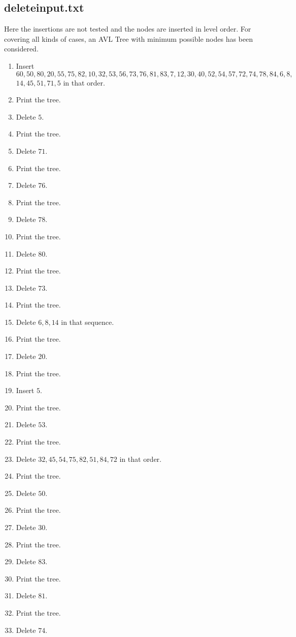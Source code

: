 \documentclass{article}
\begin{document}
\subsection{deleteinput.txt}
Here the insertions are not tested and the nodes are inserted in level order. For covering all kinds of cases, an AVL Tree with minimum possible nodes has been considered.
\begin{enumerate}
	\item Insert $60,50,80,20,55,75,82,10,32,53,56,73,76,81,83,7,12,30,40,52,54,57,72,74,78,84,6,8,$\newline$14,45,51,71,5$ in that order.
	\item Print the tree.
	\item Delete $5$.
	\item Print the tree.
	\item Delete $71$.
	\item Print the tree.
	\item Delete $76$.
	\item Print the tree.
	\item Delete $78$.
	\item Print the tree.
	\item Delete $80$.
	\item Print the tree.
	\item Delete $73$.
	\item Print the tree.
	\item Delete $6,8,14$ in that sequence.
	\item Print the tree.
	\item Delete $20$.
	\item Print the tree.
	\item Insert $5$.
	\item Print the tree.
	\item Delete $53$.
	\item Print the tree.
	\item Delete $32,45,54,75,82,51,84,72$ in that order.
	\item Print the tree.
	\item Delete $50$.
	\item Print the tree.
	\item Delete $30$.
	\item Print the tree.
	\item Delete $83$.
	\item Print the tree.
	\item Delete $81$.
	\item Print the tree.
	\item Delete $74$.

\end{enumerate}
\end{document}

